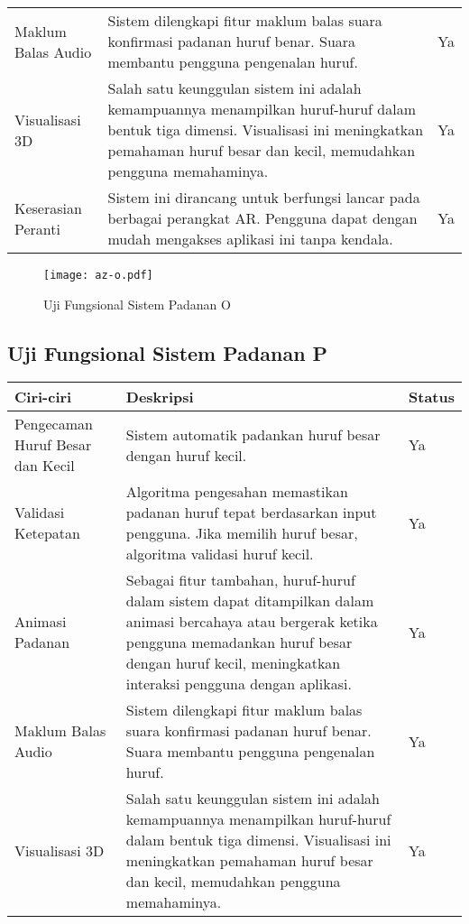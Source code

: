 \begin{itemize}
\begin{itemize}
\begin{itemize}
\begin{itemize}
\begin{itemize}
\begin{itemize}
\begin{itemize}
\begin{itemize}
\begin{flushleft}
\begin{tabular}{>{\raggedright}p{3cm}p{9cm}>{\centering\arraybackslash}p{2cm}}
Maklum Balas Audio & Sistem dilengkapi fitur maklum balas suara konfirmasi padanan huruf benar. Suara membantu pengguna pengenalan huruf. & Ya \\

Visualisasi 3D & Salah satu keunggulan sistem ini adalah kemampuannya menampilkan huruf-huruf dalam bentuk tiga dimensi. Visualisasi ini meningkatkan pemahaman huruf besar dan kecil, memudahkan pengguna memahaminya. & Ya \\

Keserasian Peranti & Sistem ini dirancang untuk berfungsi lancar pada berbagai perangkat AR. Pengguna dapat dengan mudah mengakses aplikasi ini tanpa kendala. & Ya \\
\bottomrule
\end{tabular}

\begin{figure}
    \centering
    \texttt{[image: az-o.pdf]}
    \caption{Uji Fungsional  Sistem Padanan O }
    \label{fig:az-o.pdf}
\end{figure}
\subsection{Uji Fungsional  Sistem Padanan P}

\begin{tabular}{>{\raggedright}p{3cm}p{9cm}>{\centering\arraybackslash}p{2cm}}
\toprule
\textbf{Ciri-ciri} & \textbf{Deskripsi} & \textbf{Status} \\
\midrule
Pengecaman Huruf Besar dan Kecil & Sistem automatik padankan huruf besar dengan huruf kecil. & Ya \\

Validasi Ketepatan & Algoritma pengesahan memastikan padanan huruf tepat berdasarkan input pengguna. Jika memilih huruf besar, algoritma validasi huruf kecil. & Ya \\

Animasi Padanan & Sebagai fitur tambahan, huruf-huruf dalam sistem dapat ditampilkan dalam animasi bercahaya atau bergerak ketika pengguna memadankan huruf besar dengan huruf kecil, meningkatkan interaksi pengguna dengan aplikasi. & Ya \\

Maklum Balas Audio & Sistem dilengkapi fitur maklum balas suara konfirmasi padanan huruf benar. Suara membantu pengguna pengenalan huruf. & Ya \\

Visualisasi 3D & Salah satu keunggulan sistem ini adalah kemampuannya menampilkan huruf-huruf dalam bentuk tiga dimensi. Visualisasi ini meningkatkan pemahaman huruf besar dan kecil, memudahkan pengguna memahaminya. & Ya \\


\end{tabular}
\end{flushleft}
\end{itemize}
\end{itemize}
\end{itemize}
\end{itemize}
\end{itemize}
\end{itemize}
\end{itemize}
\end{itemize}
